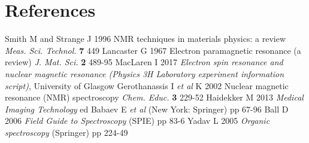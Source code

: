 \documentclass[a4paper]{jpconf}
\numberwithin{equation}{section}
\begin{document}
\section*{References}
\begin{thebibliography}{9}
 Smith M and Strange J 1996 NMR techniques in materials physics: a review \textit{Meas. Sci. Technol.} \textbf{7} 449
 Lancaster G 1967 Electron paramagnetic resonance (a review) \textit{J. Mat. Sci.} \textbf{2} 489-95
 MacLaren I 2017 \textit{Electron spin resonance and nuclear magnetic resonance (Physics 3H Laboratory experiment information script)}, University of Glasgow
 Gerothanassis I \textit{et al} K 2002 Nuclear magnetic resonance (NMR) spectroscopy \textit{Chem. Educ.} \textbf{3} 229-52
 Haidekker M 2013 \textit{Medical Imaging Technology} ed Babaev E \textit{et al} (New York: Springer) pp 67-96
 Ball D 2006 \textit{Field Guide to Spectroscopy} (SPIE) pp 83-6
 Yadav L 2005 \textit{Organic spectroscopy} (Springer) pp 224-49
\end{thebibliography}
\end{document}

